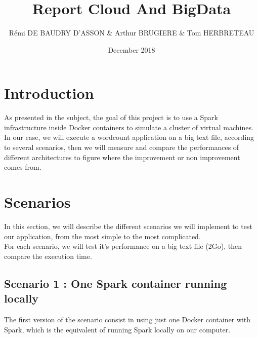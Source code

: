 \documentclass{article}
\title{Report Cloud And BigData}
\author{Rémi DE BAUDRY D'ASSON & Arthur BRUGIERE & Tom HERBRETEAU }
\date{December 2018}
\begin{document}
\maketitle

\section{Introduction}

As presented in the subject, the goal of this project is to use a Spark infrastructure inside Docker containers to simulate a cluster of virtual machines. \\

In our case, we will execute a wordcount application on a big text file, according to several scenarios, then we will measure and compare the performances of different architectures to figure where the improvement or non improvement comes from.

\section{Scenarios}

In this section, we will describe the different scenarios we will implement to test our application, from the most simple to the most complicated. \\

For each scenario, we will test it's performance on a big text file (2Go), then compare the execution time.



\subsection{Scenario 1 : One Spark container running locally}

The first version of the scenario consist in using just one Docker container with Spark, which is the equivalent of running Spark locally on our computer. \\
\end{document}
